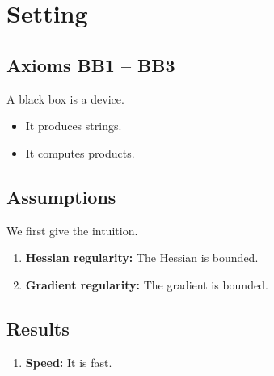 \documentclass{article}
\begin{document}
\section{Setting}
\subsection{Axioms  BB1 -- BB3}
A black box is a device.
\begin{itemize}
\item[\textbf{BB1}] It produces strings.
\item[\textbf{BB2}] It computes products.
\end{itemize}
\subsection{Assumptions}
We first give the intuition.
\begin{enumerate}
  \item \textbf{Hessian regularity:} The Hessian is bounded.
  \item \textbf{Gradient regularity:} The gradient is bounded.
\end{enumerate}
\subsection{Results}
\begin{enumerate}
  \item \textbf{Speed:} It is fast.
\end{enumerate}
\end{document}
